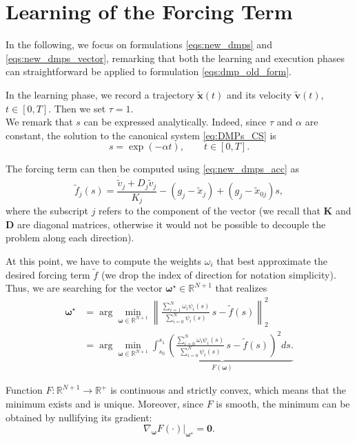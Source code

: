 \documentclass[fleqn, 11pt]{article}
\theoremstyle{definition}
\theoremstyle{plain}
\theoremstyle{remark}
\begin{document}
\section{Learning of the Forcing Term}\label{subsec:dmp_learning}

In the following, we focus on formulations \eqref{eqs:new_dmps} and \eqref{eqs:new_dmps_vector}, remarking that both the learning and execution phases can straightforward be applied to formulation \eqref{eqs:dmp_old_form}.

In the learning phase, we record a trajectory $\tilde{\mathbf{x}} (t)$ and its velocity $\tilde{\mathbf{v}} (t)$, $t \in [0, T]$.
Then we set $\tau = 1$.\\
We remark that $s$ can be expressed analytically.
Indeed, since $ \tau $ and $ \alpha $ are constant, the solution to the canonical system \ref{eq:DMPs_CS} is
\[ s = \exp (- \alpha t), \qquad t \in [0, T] . \]

The forcing term can then be computed using \eqref{eq:new_dmps_acc} as
\[ \tilde{f}_j (s) = \frac{ \dot{ \tilde{v} }_j + D_{ j } \tilde{v}_j } { K_{ j } } - (g_j - \tilde{x}_j ) + ( g_j - \tilde {x}_{0 j} ) s , \]
where the subscript $j$ refers to the component of the vector (we recall that $\mathbf{K}$ and $\mathbf{D}$ are diagonal matrices, otherwise it would not be possible to decouple the problem along each direction).

At this point, we have to compute the weights $\omega_i$ that best approximate the desired forcing term $\tilde{f}$ (we drop the index of direction for notation simplicity).
Thus, we are searching for the vector $\bm{\omega}^\star \in \mathbb{R}^{N+1}$ that realizes
\begin{subequations}
    \begin{align}
        \bm{\omega}^\star & 
            = \arg\min_{\bm{\omega} \in \mathbb{R}^{N+1}} \left\|{\frac{ \sum_{i=1}^N \omega_i \psi_i(s) }{ \sum_{i=0}^N \psi_i(s) } \,s - \tilde{f}(s) }\right\|_2^2 \\
            & = \arg\min_{\bm{\omega} \in \mathbb{R}^{N+1}} \underbrace{\int_{s_0}^{s_1} \left(   { \frac{ \sum_{i=0}^N \omega_i \psi_i(s) }{ \sum_{i=0}^N \psi_i(s) } \,s - \tilde{f}(s) }\right)^2 d\! s.}_{F(\bm{\omega})}
    \end{align}
\end{subequations}

Function $F : \mathbb{R}^{N+1} \to \mathbb{R} ^ + $ is continuous and strictly convex, which means that the minimum exists and is unique.
Moreover, since $F$ is smooth, the minimum can be obtained by nullifying its gradient:
\[ \nabla_{\bm{\omega}} F(\cdot)|_{\bm{\omega} ^ \star} = \mathbf{0}. \]
\end{document}
